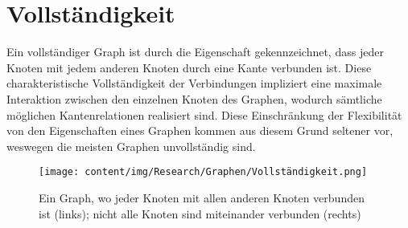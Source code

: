 \section{Vollständigkeit}

Ein vollständiger Graph ist durch die Eigenschaft gekennzeichnet, dass jeder Knoten mit jedem anderen Knoten durch eine Kante verbunden ist. Diese charakteristische Vollständigkeit der Verbindungen impliziert eine maximale Interaktion zwischen den einzelnen Knoten des Graphen, wodurch sämtliche möglichen Kantenrelationen realisiert sind. Diese Einschränkung der Flexibilität von den Eigenschaften eines Graphen kommen aus diesem Grund seltener vor, weswegen die meisten Graphen unvollständig sind. \cite{ohlbach2018graphen}

\begin{figure}
    \centering
    \texttt{[image: content/img/Research/Graphen/Vollständigkeit.png]}
    \caption{Ein Graph, wo jeder Knoten mit allen anderen Knoten verbunden ist (links); nicht alle Knoten sind miteinander verbunden (rechts)}
    \label{fig:vollständigkeit}
\end{figure}
\FloatBarrier